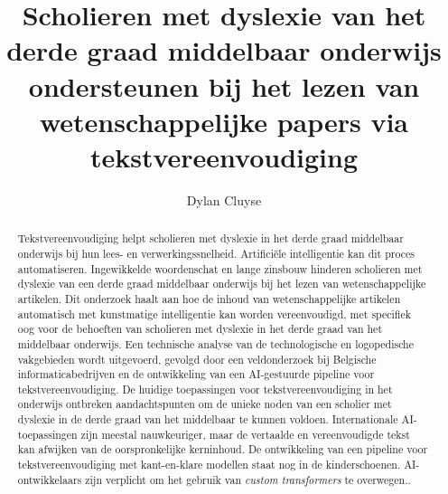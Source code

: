 \documentclass{hogent-article}
\title{Scholieren met dyslexie van het derde graad middelbaar onderwijs ondersteunen bij het lezen van wetenschappelijke papers via tekstvereenvoudiging}
\author{Dylan Cluyse}
\begin{document}
	
\begin{abstract}
Tekstvereenvoudiging helpt scholieren met dyslexie in het derde graad middelbaar onderwijs bij hun lees- en verwerkingssnelheid. Artificiële intelligentie kan dit proces automatiseren. Ingewikkelde woordenschat en lange zinsbouw hinderen scholieren met dyslexie van een derde graad middelbaar onderwijs bij het lezen van wetenschappelijke artikelen. Dit onderzoek haalt aan hoe de inhoud van wetenschappelijke artikelen automatisch  met kunstmatige intelligentie kan worden vereenvoudigd, met specifiek oog voor de behoeften van scholieren met dyslexie in het derde graad van het middelbaar onderwijs. Een technische analyse van de technologische en logopedische vakgebieden wordt uitgevoerd, gevolgd door een veldonderzoek bij Belgische informaticabedrijven en de ontwikkeling van een AI-gestuurde pipeline voor tekstvereenvoudiging. De huidige toepassingen voor tekstvereenvoudiging in het onderwijs ontbreken aandachtspunten om de unieke noden van een scholier met dyslexie in de derde graad van het middelbaar te kunnen voldoen. Internationale AI-toepassingen zijn meestal nauwkeuriger, maar de vertaalde en vereenvoudigde tekst kan afwijken van de oorspronkelijke kerninhoud. De ontwikkeling van een pipeline voor tekstvereenvoudiging met kant-en-klare modellen staat nog in de kinderschoenen. AI-ontwikkelaars zijn verplicht om het gebruik van \textit{custom transformers} te overwegen..
\end{abstract}

\tableofcontents



\printbibliography[heading=bibintoc]
\end{document}
